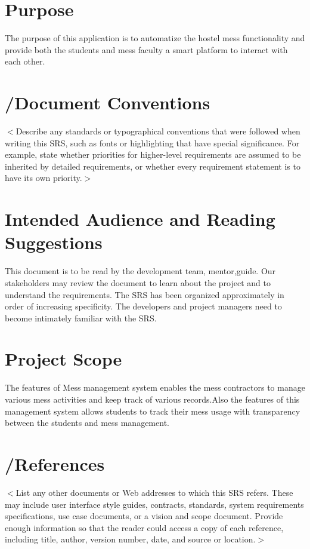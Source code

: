 \documentclass{scrreprt}
\begin{document}
\section{Purpose}
The purpose of this application is to automatize the hostel mess functionality and provide both the students and mess faculty a smart platform to interact with each other. 

\section{/Document Conventions}
$<$Describe any standards or typographical conventions that were followed when 
writing this SRS, such as fonts or highlighting that have special significance.  
For example, state whether priorities  for higher-level requirements are assumed 
to be inherited by detailed requirements, or whether every requirement statement 
is to have its own priority.$>$

\section{Intended Audience and Reading Suggestions}
This document is to be read by the development team, mentor,guide. Our stakeholders may  review  the  document to  learn  about  the project and to understand the requirements. The SRS has been organized approximately in order of  increasing  specificity.  The  developers  and  project  managers  need  to  become  intimately familiar with the SRS. 

\section{Project Scope}
The features of Mess management system enables the mess contractors to manage various mess activities and keep track of various records.Also the features of this management system allows students to track their mess usage with transparency between the students and mess management. 


\section{/References}
$<$List any other documents or Web addresses to which this SRS refers. These may 
include user interface style guides, contracts, standards, system requirements 
specifications, use case documents, or a vision and scope document. Provide 
enough information so that the reader could access a copy of each reference, 
including title, author, version number, date, and source or location.$>$
\end{document}
